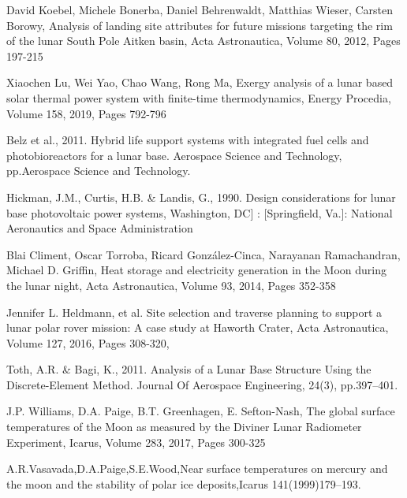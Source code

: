 \documentclass{beamer}
\begin{document}
\begin{thebibliography}{99}



David Koebel, Michele Bonerba, Daniel Behrenwaldt, Matthias Wieser, Carsten Borowy,
Analysis of landing site attributes for future missions targeting the rim of the lunar South Pole Aitken basin,
Acta Astronautica,
Volume 80,
2012,
Pages 197-215

Xiaochen Lu, Wei Yao, Chao Wang, Rong Ma,
Exergy analysis of a lunar based solar thermal power system with finite-time thermodynamics,
Energy Procedia,
Volume 158,
2019,
Pages 792-796


 Belz et al., 2011. Hybrid life support systems with integrated fuel cells and photobioreactors for a lunar base. Aerospace Science and Technology, pp.Aerospace Science and Technology.

Hickman, J.M., Curtis, H.B. \& Landis, G., 1990. Design considerations for lunar base photovoltaic power systems, Washington, DC] : [Springfield, Va.]: National Aeronautics and Space Administration

Blai Climent, Oscar Torroba, Ricard González-Cinca, Narayanan Ramachandran, Michael D. Griffin,
Heat storage and electricity generation in the Moon during the lunar night,
Acta Astronautica,
Volume 93,
2014,
Pages 352-358

Jennifer L. Heldmann, et al. Site selection and traverse planning to support a lunar polar rover mission: A case study at Haworth Crater,
Acta Astronautica, Volume 127, 2016, Pages 308-320,

Toth, A.R. \& Bagi, K., 2011. Analysis of a Lunar Base Structure Using the Discrete-Element Method. Journal Of Aerospace Engineering, 24(3), pp.397–401.

J.P. Williams, D.A. Paige, B.T. Greenhagen, E. Sefton-Nash,
The global surface temperatures of the Moon as measured by the Diviner Lunar Radiometer Experiment,
Icarus,
Volume 283,
2017,
Pages 300-325


A.R.Vasavada,D.A.Paige,S.E.Wood,Near surface temperatures on
mercury and the moon and the stability of polar ice deposits,Icarus
141(1999)179–193.


\end{thebibliography}
\end{document}
